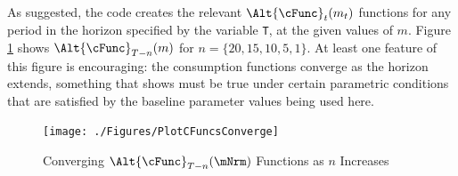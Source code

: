 \documentclass[titlepage, headings=optiontotocandhead]{\econtex}
\begin{document}
As suggested, the code creates the relevant $\Alt{\cFunc}_{t}({m}_{t})$
functions for any period in the horizon specified by the variable \texttt{T}, at the given values of ${m}$.
Figure \ref{fig:PlotCFuncsConverge} shows
$\Alt{\cFunc}_{T-n}({m})$ for $n=\{20,15,10,5,1\}$.  At least one
feature of this figure is encouraging: the consumption functions
converge as the horizon extends, something that \cite{BufferStockTheory}
shows must be true under certain parametric conditions that are
satisfied by the baseline parameter values being used here.


\hypertarget{PlotCFuncsConverge}{}
\begin{figure}
  \texttt{[image: ./Figures/PlotCFuncsConverge]}
  \caption{Converging $\Alt{\cFunc}_{T-n}({\mNrm})$ Functions as $n$ Increases}
  \label{fig:PlotCFuncsConverge}
\end{figure}
\end{document}
